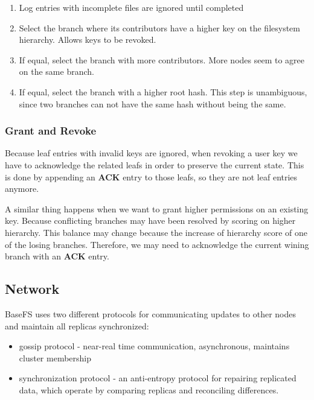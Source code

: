 \documentclass{sig-alternate}
\begin{document}
\begin{enumerate}
\item Log entries with incomplete files are ignored until completed
\item Select the branch where its contributors have a higher key on the filesystem hierarchy. Allows keys to be revoked.
\item If equal, select the branch with more contributors. More nodes seem to agree on the same branch.
\item If equal, select the branch with a higher root hash. This step is unambiguous, since two branches can not have the same hash without being the same.
\end{enumerate}

\subsubsection{Grant and Revoke}
Because leaf entries with invalid keys are ignored, when revoking a user key we have to acknowledge the related leafs in order to preserve the current state. This is done by appending an \textbf{ACK} entry to those leafs, so they are not leaf entries anymore.

A similar thing happens when we want to grant higher permissions on an existing key. Because conflicting branches may have been resolved by scoring on higher hierarchy. This balance may change because the increase of hierarchy score of one of the losing branches. Therefore, we may need to acknowledge the current wining branch with an \textbf{ACK} entry.


\subsection{Network} \label{network}

BaseFS uses two different protocols for communicating updates to other nodes and maintain all replicas synchronized:

\begin{itemize}
    \item gossip protocol - near-real time communication, asynchronous, maintains cluster membership
    \item synchronization protocol - an anti-entropy protocol for repairing replicated data, which operate by comparing replicas and reconciling differences.
\end{itemize}
\end{document}
